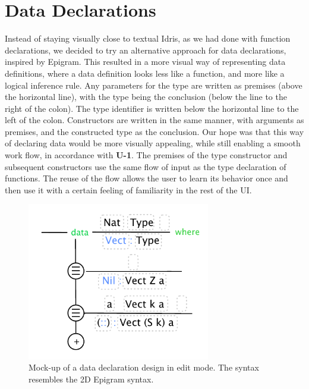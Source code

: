 \section{Data Declarations}
Instead of staying visually close to textual Idris, as we had done with function declarations, we decided to try an alternative approach for data declarations, inspired by Epigram.
This resulted in a more visual way of representing data definitions, where a data definition looks less like a function, and more like a logical inference rule.
Any parameters for the type are written as premises (above the horizontal line), with the type being the conclusion
(below the line to the right of the colon). The type identifier is written
below the horizontal line to the left of the colon.
Constructors are written in the same manner, with arguments as premises, and the constructed type as the conclusion.
Our hope was that this way of declaring data would be more visually appealing, while still enabling a smooth work flow, in accordance with \textbf{U-1}.
The premises of the type constructor and subsequent constructors use the same flow of input as the type declaration of functions.
The reuse of the flow allows the user to learn its behavior once and then use it with a certain feeling of familiarity in the rest of the UI\@.

\begin{figure}
	\centering
		\includegraphics[width=80mm]{diagrams/initial_data_declaration_design.pdf}
	\caption{Mock-up of a data declaration design in edit mode. The syntax
	resembles the 2D Epigram syntax.}
\label{fig:initial_data_declaration_design}
\end{figure}

